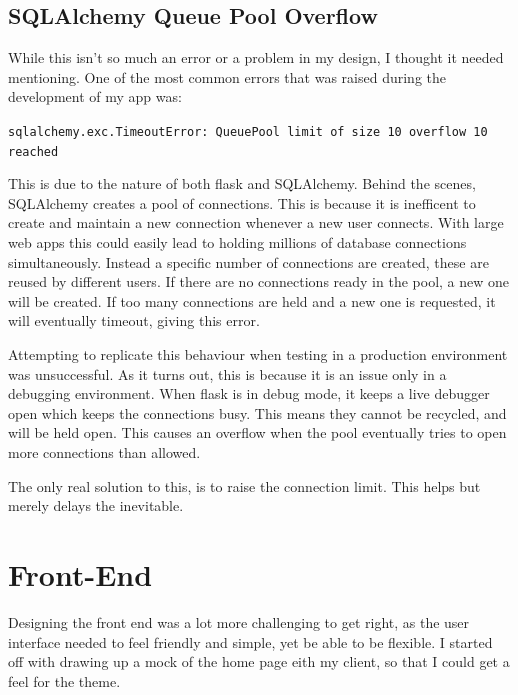 \documentclass[a4paper,oneside,12pt,draft]{report}
\begin{document}
	\subsection{SQLAlchemy Queue Pool Overflow}
	While this isn't so much an error or a problem in my design, I thought it needed mentioning. One of the most common errors that was raised during the development of my app was:
	\begin{framed}
		\lstinline|sqlalchemy.exc.TimeoutError: QueuePool limit of size 10 overflow 10 reached|
	\end{framed}
	This is due to the nature of both flask and SQLAlchemy. Behind the scenes, SQLAlchemy creates a pool of connections. This is because it is inefficent to create and maintain a new connection whenever a new user connects. With large web apps this could easily lead to holding millions of database connections simultaneously. Instead a specific number of connections are created, these are reused by different users. If there are no connections ready in the pool, a new one will be created. If too many connections are held and a new one is requested, it will eventually timeout, giving this error.

	Attempting to replicate this behaviour when testing in a production environment was unsuccessful. As it turns out, this is because it is an issue only in a debugging environment. When flask is in debug mode, it keeps a live debugger open which keeps the connections busy. This means they cannot be recycled, and will be held open. This causes an overflow when the pool eventually tries to open more connections than allowed.

	The only real solution to this, is to raise the connection limit. This helps but merely delays the inevitable.

	\section{Front-End}
	Designing the front end was a lot more challenging to get right, as the user interface needed to feel friendly and simple, yet be able to be flexible. I started off with drawing up a mock of the home page eith my client, so that I could get a feel for the theme.
\end{document}
